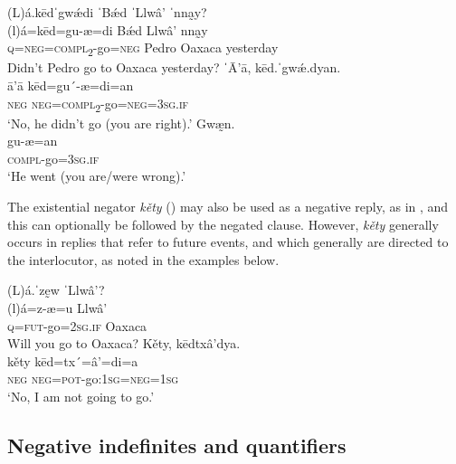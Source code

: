 \documentclass[output=paper,colorlinks=true, citecolor=brown]{langscibook}
\begin{document}
\ea\label{ex:zap:656667} 
    \begin{xlist}[A2: ]
    \label{ex:zap:65} 
        \glll (L)á.kēdˈgwǽdi ˈBǽd ˈLlwâ’ ˈnna̰y?\\ 
          (l)á=kēd=gu-æ=di Bǽd Llwâ’ nna̰y\\
           \textsc{q}=\textsc{neg}=\textsc{compl}\textsc{\textsubscript{2}}{}-go=\textsc{neg} Pedro Oaxaca yesterday\\
    \glt  Didn’t Pedro go to Oaxaca yesterday?
    \label{ex:zap:66} 
        \glll ˈĀ'ā, kēd.ˈgwǽ.dyan.\\ 
           ā'ā kēd=gu´-æ=di=an\\
           \textsc{neg} \textsc{neg}=\textsc{compl}\textsc{\textsubscript{2}}{}-go=\textsc{neg}=\textsc{3sg.if}\\
    \glt  ‘No, he didn’t go (you are right).’
    \label{ex:zap:67} 
        \glll Gwæ̰n.\\ 
           gu-æ=an\\
           \textsc{compl}{}-go=\textsc{3sg.if}\\
        \glt  ‘He went (you are/were wrong).’
    \end{xlist}
\z 

The existential negator \textit{kěty} () may also be used as a negative reply, as in , and this can optionally be followed by the negated clause. However, \textit{kěty} generally occurs in replies that refer to future events, and which generally are directed to the interlocutor, as noted in the examples below.

\ea\label{ex:zap:68}
    \begin{xlist}[A: ]
    \label{ex:zap:68A} 
        \glll (L)á.ˈzḛw ˈLlwâ’?\\ 
               (l)á=z-æ=u Llwâ’\\
               \textsc{q}=\textsc{fut}{}-go=2\textsc{sg.if} Oaxaca \\
        \glt  Will you go to Oaxaca?
    \label{ex:zap:68B} 
        \glll Kěty, kēdtxâ’dya.\\ 
               kěty kēd=tx´=â’=di=a\\
               \textsc{neg} \textsc{neg}=\textsc{pot}{}-go:\textsc{1sg}=\textsc{neg}=\textsc{1sg}\\
        \glt  ‘No, I am not going to go.’
    \end{xlist}
\z 

\subsection{Negative indefinites and quantifiers}\label{sec:zap:3.2}
\end{document}
